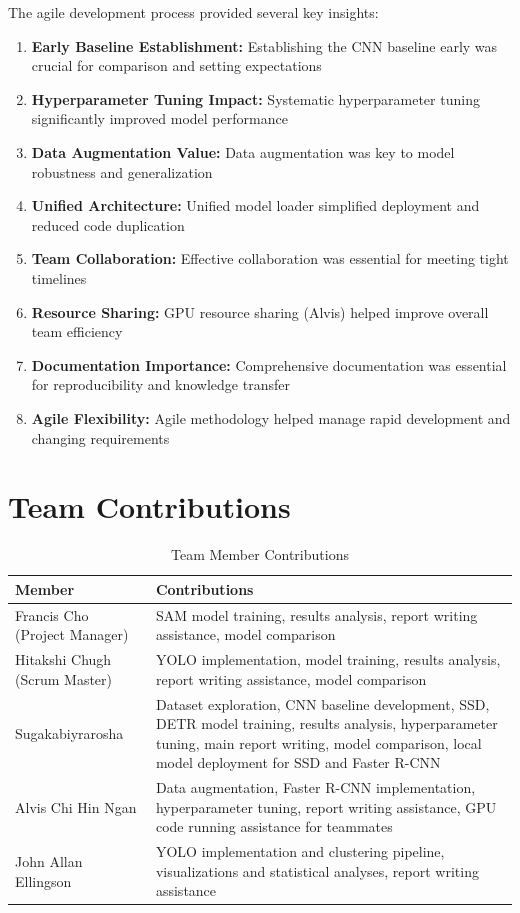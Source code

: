\documentclass[12pt,a4paper]{article}
\begin{document}
The agile development process provided several key insights:

\begin{enumerate}
    \item \textbf{Early Baseline Establishment:} Establishing the CNN baseline early was crucial for comparison and setting expectations
    \item \textbf{Hyperparameter Tuning Impact:} Systematic hyperparameter tuning significantly improved model performance
    \item \textbf{Data Augmentation Value:} Data augmentation was key to model robustness and generalization
    \item \textbf{Unified Architecture:} Unified model loader simplified deployment and reduced code duplication
    \item \textbf{Team Collaboration:} Effective collaboration was essential for meeting tight timelines
    \item \textbf{Resource Sharing:} GPU resource sharing (Alvis) helped improve overall team efficiency
    \item \textbf{Documentation Importance:} Comprehensive documentation was essential for reproducibility and knowledge transfer
    \item \textbf{Agile Flexibility:} Agile methodology helped manage rapid development and changing requirements
\end{enumerate}

\section{Team Contributions}

\begin{table}[H]
\centering
\caption{Team Member Contributions}
\label{tab:contributions}
\begin{tabular}{@{}lp{10cm}@{}}
\toprule
\textbf{Member} & \textbf{Contributions} \\
\midrule
Francis Cho (Project Manager) & SAM model training, results analysis, report writing assistance, model comparison \\
Hitakshi Chugh (Scrum Master) & YOLO implementation, model training, results analysis, report writing assistance, model comparison \\
Sugakabiyrarosha & Dataset exploration, CNN baseline development, SSD, DETR model training, results analysis, hyperparameter tuning, main report writing, model comparison, local model deployment for SSD and Faster R-CNN \\
Alvis Chi Hin Ngan & Data augmentation, Faster R-CNN implementation, hyperparameter tuning, report writing assistance, GPU code running assistance for teammates \\
John Allan Ellingson & YOLO implementation and clustering pipeline, visualizations and statistical analyses, report writing assistance \\
\bottomrule
\end{tabular}
\end{table}
\end{document}
